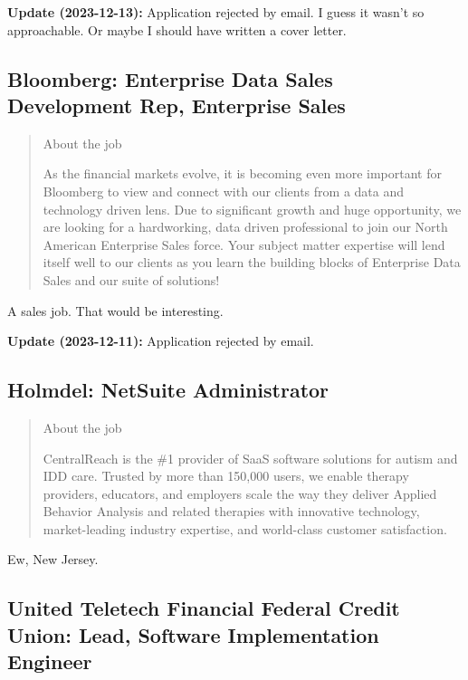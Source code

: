 \documentclass[
	letterpaper, %
	12pt, %
]{CSSullivanBusinessReport}
\begin{document}
\textbf{Update (2023-12-13):} Application rejected by email. I guess it wasn't so approachable. Or maybe I should have written a cover letter. 



\subsection[Bloomberg]{Bloomberg: Enterprise Data Sales Development Rep, Enterprise Sales}

\begin{quote}
	About the job
	
	As the financial markets evolve, it is becoming even more important for Bloomberg to view and connect with our clients from a data and technology driven lens. Due to significant growth and huge opportunity, we are looking for a hardworking, data driven professional to join our North American Enterprise Sales force. Your subject matter expertise will lend itself well to our clients as you learn the building blocks of Enterprise Data Sales and our suite of solutions! 

\end{quote}

A sales job. That would be interesting. 

\textbf{Update (2023-12-11):} Application rejected by email.


\subsection[Holmdel]{Holmdel: NetSuite Administrator}

\begin{quote}
	About the job
	
	CentralReach is the \#1 provider of SaaS software solutions for autism and IDD care. Trusted by more than 150,000 users, we enable therapy providers, educators, and employers scale the way they deliver Applied Behavior Analysis and related therapies with innovative technology, market-leading industry expertise, and world-class customer satisfaction. 

\end{quote}

Ew, New Jersey.


\subsection[United Teletech Financial Federal Credit Union]{United Teletech Financial Federal Credit Union: Lead, Software Implementation Engineer}
\end{document}
